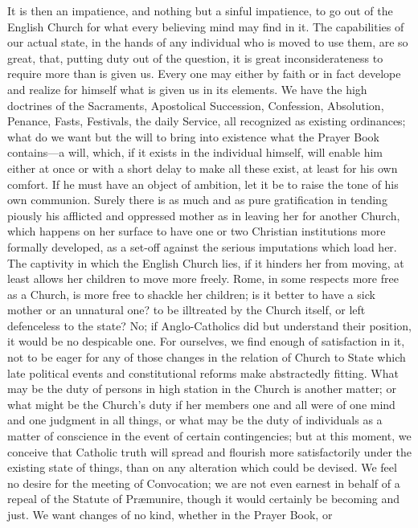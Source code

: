 It is then an impatience, and nothing but a sinful
impatience, to go out of the English Church for what every believing
mind may find in it. The capabilities of our actual state, in the hands
of any individual who is moved to use them, are so great, that, putting
duty out of the question, it is great inconsiderateness to require more
than is given us. Every one may either by faith or in fact develope and
realize for himself what is given us in its elements. We have the high
doctrines of the Sacraments, Apostolical Succession, Confession,
Absolution, Penance, Fasts, Festivals, the daily Service, all recognized
as existing ordinances; what do we want but the will to bring into
existence what the Prayer Book contains—a will, which, if it exists in
the individual himself, will enable him either at once or with a short
delay to make all these exist, at least for his own comfort. If he must
have an object of ambition, let it be to raise the tone of his own
communion. Surely there is as much and as pure gratification in tending
piously his afflicted and oppressed mother as in leaving her for another
Church, which happens on her surface to have one or two Christian
institutions more formally developed, as a set-off against the serious
imputations which load her. The captivity in which the English Church
lies, if it hinders her from moving, at least allows her children to
move more freely. Rome, in some respects more free as a Church, is more
free to shackle her children; is it better to have a sick mother or an
unnatural one? to be illtreated by the Church itself, or left
defenceless to the state? No; if Anglo-Catholics did but understand
their position, it would be no despicable one. For ourselves, we find
enough of satisfaction in it, not to be eager for any of those changes
in the relation of Church to State which late political events and
constitutional reforms make abstractedly fitting. What may be the duty
of persons in high station in the Church is another matter; or what
might be the Church's duty if her members one and all were of one mind
and one judgment in all things, or what may be the duty of individuals
as a matter of conscience in the event of certain contingencies; but at
this moment, we conceive that Catholic truth will spread and flourish
more satisfactorily under the existing state of things, than on any
alteration which could be devised. We feel no desire for the meeting of
Convocation; we are not even earnest in behalf of a repeal of the
Statute of Præmunire, though it would certainly be becoming and just.
We want changes of no kind, whether in the Prayer Book, or
